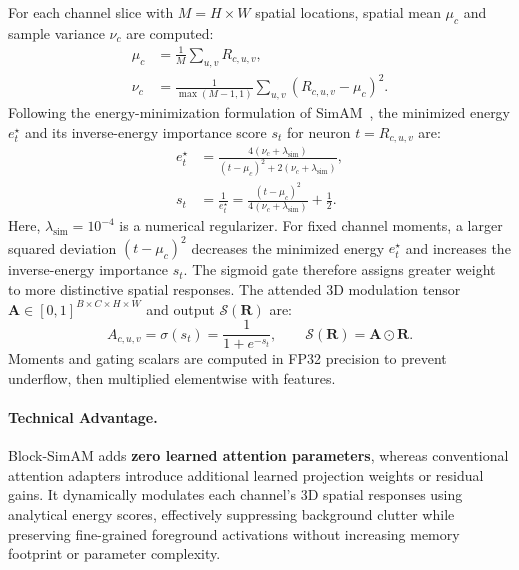 For each channel slice with $M = H \times W$ spatial locations, spatial mean $\mu_c$ and sample variance $\nu_c$ are computed:
\begin{equation}
    \begin{aligned}
        \mu_c &= \frac{1}{M}\sum_{u, v} R_{c, u, v}, \\
        \nu_c &= \frac{1}{\max(M-1, 1)}\sum_{u, v} (R_{c, u, v} - \mu_c)^2.
    \end{aligned}
    \label{eq:spatial_moments}
\end{equation}
Following the energy-minimization formulation of SimAM~\cite{yang2021simam}, the minimized energy $e_t^\star$ and its inverse-energy importance score $s_t$ for neuron $t = R_{c,u,v}$ are:
\begin{equation}
    \begin{aligned}
        e_t^\star &= \frac{4(\nu_c + \lambda_{\mathrm{sim}})}{(t-\mu_c)^2 + 2(\nu_c + \lambda_{\mathrm{sim}})}, \\
        s_t &= \frac{1}{e_t^\star} = \frac{(t - \mu_c)^2}{4(\nu_c + \lambda_{\mathrm{sim}})} + \frac{1}{2}.
    \end{aligned}
    \label{eq:simam_energy}
\end{equation}
Here, $\lambda_{\mathrm{sim}} = 10^{-4}$ is a numerical regularizer. For fixed channel moments, a larger squared deviation $(t-\mu_c)^2$ decreases the minimized energy $e_t^\star$ and increases the inverse-energy importance $s_t$. The sigmoid gate therefore assigns greater weight to more distinctive spatial responses. The attended 3D modulation tensor $\mathbf{A} \in [0, 1]^{B \times C \times H \times W}$ and output $\mathcal{S}(\mathbf{R})$ are:
\begin{equation}
    A_{c, u, v} = \sigma(s_t) = \frac{1}{1 + e^{-s_t}}, \qquad \mathcal{S}(\mathbf{R}) = \mathbf{A} \odot \mathbf{R}.
    \label{eq:simam_modulation}
\end{equation}
Moments and gating scalars are computed in FP32 precision to prevent underflow, then multiplied elementwise with features.

\paragraph{Technical Advantage.}
Block-SimAM adds \textbf{zero learned attention parameters}, whereas conventional attention adapters introduce additional learned projection weights or residual gains. It dynamically modulates each channel's 3D spatial responses using analytical energy scores, effectively suppressing background clutter while preserving fine-grained foreground activations without increasing memory footprint or parameter complexity.


